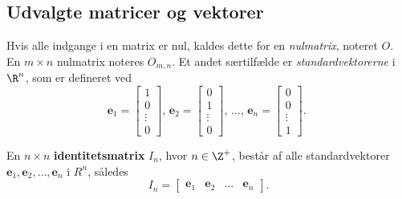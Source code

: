 \subsection{Udvalgte matricer og vektorer} 
% 
Hvis alle indgange i en matrix er nul, kaldes dette for en \textit{nulmatrix}, noteret $O$. 
En $m \times n$ nulmatrix noteres $O_{m,n}$.
%
Et andet særtilfælde er \textit{standardvektorerne} i $\R^n$, som er defineret ved  
$$
\textbf{e}_1=
\begin{bmatrix}
1 \\ 
0 \\ 
\vdots \\
0
\end{bmatrix}
\text{, }
\textbf{e}_2=
\begin{bmatrix}
0 \\ 
1 \\ 
\vdots \\
0
\end{bmatrix}
\text{, }
\ldots
\text{, }
\textbf{e}_n=
\begin{bmatrix}
0 \\ 
0 \\ 
\vdots \\
1
\end{bmatrix}
\text{. }
$$
%
\begin{defn}{}{}
%
En $n \times n$ \textbf{identitetsmatrix} $I_n$, hvor $n \in \Z^+$, består af alle standardvektorer $\textbf{e}_1, \textbf{e}_2, \ldots, \textbf{e}_n$ i $R^n$, således 
$$
I_n=
\begin{bmatrix}
\textbf{e}_1 & \textbf{e}_2 & \ldots & \textbf{e}_n
\end{bmatrix}.
$$ 
\end{defn}
\noindent
%

